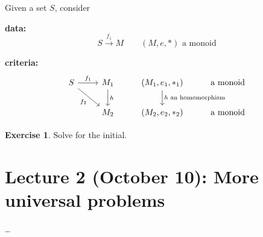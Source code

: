 \documentclass[a4paper, 12pt]{article}
\theoremstyle{definition}
\newtheorem{exercise}{Exercise}
\begin{document}
Given a set $S$, consider

\textbf{data:}
$$
S \overset{f_1}{\longrightarrow}M \qquad \text{$(M,e,\ast)$ a monoid}
$$

\textbf{criteria:}
$$
\begin{tikzcd}
    S \arrow[r, "f_1"] \arrow[dr, swap, "f_2"] & 
    M_1 
    \arrow[d, "h"] 
    & (M_1,e_1,\ast_1) 
    \arrow[d, "\text{$h$ an homomorphism}"] 
    & \text{a monoid}
    \\
    {}  
    & M_2 & (M_2,e_2,\ast_2) & \text{a monoid}
\end{tikzcd}
$$

\begin{exercise}
    Solve for the initial.
\end{exercise}

\section{Lecture 2 (October 10): More universal problems}
\vspace*{-5mm}\hspace*{7.75mm}
  \ldots
\bigskip
\end{document}
